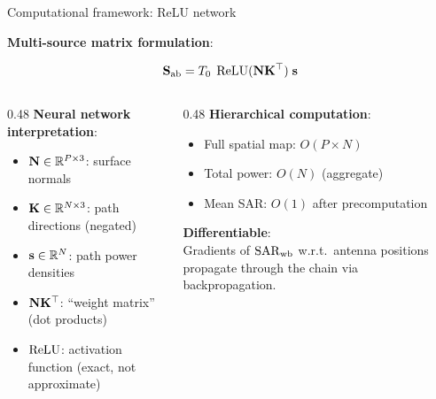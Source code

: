 \begin{frame}[label=app-p1-computation]{Computational framework: ReLU network}

  \textbf{Multi-source matrix formulation}:

  \begin{resultbox}
    \vspace{-6pt}
    \[
      \mathbf{S}_{\mathrm{ab}} = T_0\;\operatorname{ReLU}(\mathbf{N}\mathbf{K}^\top)\;\mathbf{s}
    \]
  \end{resultbox}

  \vspace{2pt}
  \begin{columns}[T]
    \begin{column}{0.48\textwidth}
      \textbf{Neural network interpretation}:
      \begin{itemize}
        \item $\mathbf{N} \in \mathbb{R}^{P \times 3}$: surface normals
        \item $\mathbf{K} \in \mathbb{R}^{N \times 3}$: path directions (negated)
        \item $\mathbf{s} \in \mathbb{R}^N$: path power densities
        \item $\mathbf{N}\mathbf{K}^\top$: ``weight matrix'' (dot products)
        \item $\operatorname{ReLU}$: activation function (exact, not approximate)
      \end{itemize}
    \end{column}

    \begin{column}{0.48\textwidth}
      \textbf{Hierarchical computation}:
      \begin{itemize}
        \item Full spatial map: $O(P \times N)$
        \item Total power: $O(N)$ (aggregate)
        \item Mean SAR: $O(1)$ after precomputation
      \end{itemize}

      \vspace{4pt}
      \textbf{Differentiable}:\\
      Gradients of $\mathrm{SAR}_{\mathrm{wb}}$ w.r.t.\ antenna positions propagate through the chain via backpropagation.
    \end{column}
  \end{columns}

  \vspace{4pt}
\end{frame}

